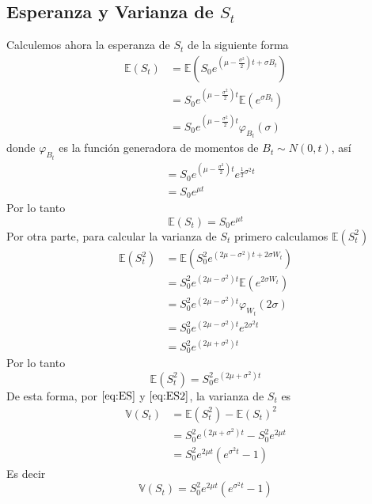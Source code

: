 \documentclass[11pt,notitlepage]{article}
\begin{document}
\subsection*{Esperanza y Varianza de $S_t$}
Calculemos ahora la esperanza de $S_t$ de la siguiente forma
\begin{align*}
    \mathbb{E}(S_t) &= \mathbb{E}\left( S_0 e^{\left(\mu - \frac{\sigma^2}{2}\right) t + \sigma B_t} \right)\\
    &= S_0 e^{\left(\mu - \frac{\sigma^2}{2}\right) t} \mathbb{E}\left( e^{\sigma B_t} \right)\\
    &= S_0 e^{\left(\mu - \frac{\sigma^2}{2}\right) t} \varphi_{B_t}(\sigma)
\end{align*}
donde $\varphi_{B_t}$ es la función generadora de momentos de $B_t \sim N(0,t)$, así
\begin{align*}
    &= S_0 e^{\left(\mu - \frac{\sigma^2}{2}\right) t} e^{\frac{1}{2} \sigma^2 t}\\
    &= S_0 e^{\mu t}
\end{align*}
Por lo tanto
\begin{equation}
    \label{eq:ES}
    \mathbb{E}(S_t) = S_0 e^{\mu t}
\end{equation}
Por otra parte, para calcular la varianza de $S_t$ primero calculamos $\mathbb{E}(S_t^2)$
\begin{align*}
    \mathbb{E}(S_t^2) &= \mathbb{E}\left( S_0^2 e^{(2\mu - \sigma^2) t + 2\sigma W_t} \right)\\
    &= S_0^2 e^{(2\mu - \sigma^2) t} \mathbb{E}\left( e^{2\sigma W_t} \right)\\
    &= S_0^2 e^{(2\mu - \sigma^2) t} \varphi_{W_t}(2\sigma)\\
    &= S_0^2 e^{(2\mu - \sigma^2) t} e^{2 \sigma^2 t}\\
    &= S_0^2 e^{(2\mu + \sigma^2) t}
\end{align*}
Por lo tanto
\begin{equation}
    \label{eq:ES2}
    \mathbb{E}(S_t^2) = S_0^2 e^{(2\mu + \sigma^2) t}
\end{equation}
De esta forma, por $\eqref{eq:ES}$ y $\eqref{eq:ES2}$, la varianza de $S_t$ es
\begin{align*}
    \mathbb{V}(S_t) &= \mathbb{E}(S_t^2) - \mathbb{E}(S_t)^2\\
    &= S_0^2 e^{(2\mu + \sigma^2) t} - S_0^2 e^{2\mu t}\\
    &= S_0^2 e^{2 \mu t} \left(e^{\sigma^2 t} - 1 \right) 
\end{align*}
Es decir
\begin{equation*}
    \label{eq:VS}
    \mathbb{V}(S_t) = S_0^2 e^{2 \mu t} \left(e^{\sigma^2 t} - 1 \right)
\end{equation*}
\end{document}
